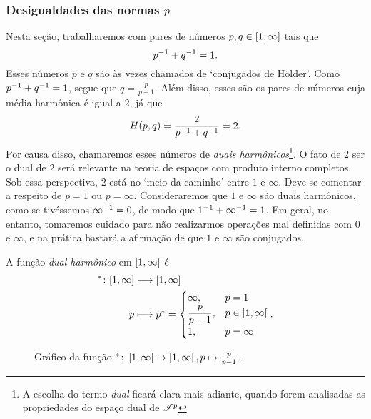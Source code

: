 \subsubsection{Desigualdades das normas \ensuremath{p}}

Nesta seção, trabalharemos com pares de números $p,q \in \left[{1},{\infty}\right]$ tais que
	\begin{equation*}
	p^{-1} + q^{-1} = 1.
	\end{equation*}
Esses números $p$ e $q$ são às vezes chamados de `conjugados de Hölder'. Como $p^{-1} + q^{-1} = 1$, segue que $q = \frac{p}{p-1}$. Além disso, esses são os pares de números cuja média harmônica é igual a $2$, já que
	\begin{equation*}
	H(p,q) = \frac{2}{p^{-1} + q^{-1}} = 2.
	\end{equation*}
Por causa disso, chamaremos esses números de \textit{duais harmônicos}\footnote{A escolha do termo \textit{dual} ficará clara mais adiante, quando forem analisadas as propriedades do espaço dual de $\mathscr{I}^p$}. O fato de $2$ ser o dual de $2$ será relevante na teoria de espaços com produto interno completos. Sob essa perspectiva, $2$ está no `meio da caminho' entre $1$ e $\infty$. Deve-se comentar a respeito de $p=1$ ou $p=\infty$. Consideraremos que $1$ e $\infty$ são duais harmônicos, como se tivéssemos $\infty^{-1}=0$, de modo que $1^{-1} + \infty^{-1} = 1$. Em geral, no entanto, tomaremos cuidado para não realizarmos operações mal definidas com $0$ e $\infty$, e na prática bastará a afirmação de que $1$ e $\infty$ são conjugados.

\begin{definition}
A função \emph{dual harmônico} em $\left[{1},{\infty}\right]$ é
	\begin{align*}
	{^*}\colon {\left[{1},{\infty}\right]} &\longrightarrow {\left[{1},{\infty}\right]} \\{p} &\longmapsto p^* = 
	\begin{cases}
		\infty,& p=1 \\
		\displaystyle\frac{p}{p-1},& p \in \left]{1},{\infty}\right[ \\
		1,& p=\infty
	\end{cases}	
	.
	\end{align*}
\end{definition}

\begin{figure}
\centering
{}
\caption{Gráfico da função $^*\colon \left[{1},{\infty}\right] \to \left[{1},{\infty}\right], p \mapsto \frac{p}{p-1}$.}
\label{fig:dual.harmonico}
\end{figure}

